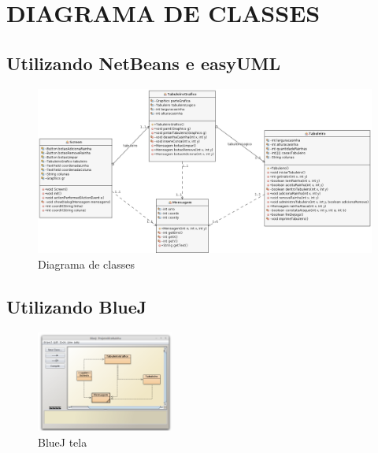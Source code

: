 
\chapter{DIAGRAMA DE CLASSES}

\section{Utilizando NetBeans e easyUML}
\begin{figure}[!htb]
	\centering
	\includegraphics[width=1.0\textwidth]{./figures/diagrama-classe.png} %
	\caption{Diagrama de classes}
\end{figure}

\section{Utilizando BlueJ}

\begin{figure}[!htb]
	\centering
	\includegraphics[width=0.4\textwidth]{./figures/diagrama-classe-bluej.png} %
	\caption{BlueJ tela}
\end{figure}

